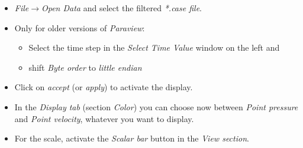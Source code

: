 \begin{itemize}
\item \emph{File$\to$Open Data} and select the filtered \emph{{*}.case
file}.
\item Only for older versions of \emph{Paraview}:
  \begin{itemize}
   \item Select the time step in the \emph{Select Time Value} window on the
left and
   \item shift \emph{Byte order} to \emph{little endian}
  \end{itemize}
\item Click on \emph{accept} (or \emph{apply}) to activate the display.
\item In the \emph{Display tab} (section \emph{Color}) you can choose now
between \emph{Point pressure} and \emph{Point velocity}, whatever
you want to display.
\item For the scale, activate the \emph{Scalar bar} button in the \emph{View
section}.
\end{itemize}
